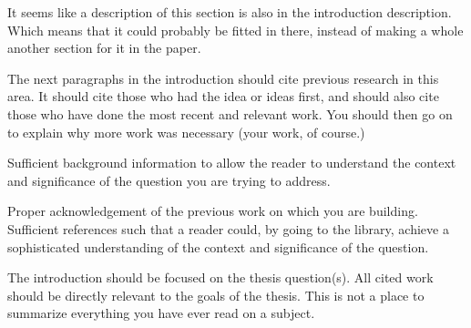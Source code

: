 It seems like a description of this section is also in the introduction
description. Which means that it could probably be fitted in there, instead of
making a whole another section for it in the paper.

The next paragraphs in the introduction should cite previous research in this
area. It should cite those who had the idea or ideas first, and should also cite
those who have done the most recent and relevant work. You should then go on to
explain why more work was necessary (your work, of course.)

Sufficient background information to allow the reader to understand the context
and significance of the question you are trying to address.

Proper acknowledgement of the previous work on which you are building.
Sufficient references such that a reader could, by going to the library, achieve
a sophisticated understanding of the context and significance of the question.

The introduction should be focused on the thesis question(s). All cited work
should be directly relevant to the goals of the thesis. This is not a place to
summarize everything you have ever read on a subject.

\fi